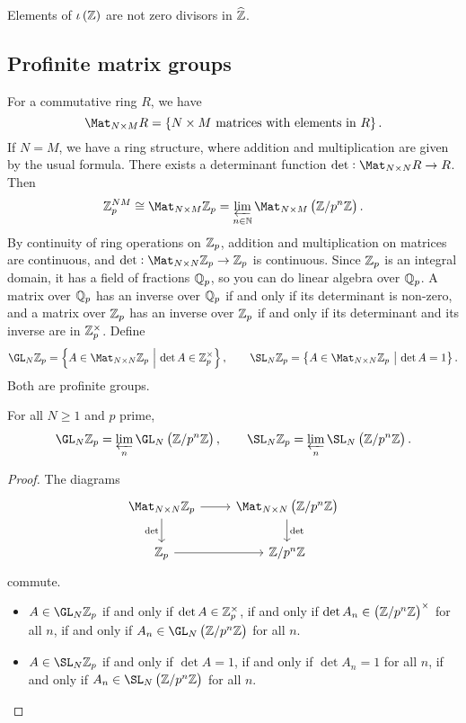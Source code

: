 Elements of $ \iota\br{\ZZ} $ are not zero divisors in $ \widehat{\mathbb{Z}} $.

\pagebreak

\subsection{Profinite matrix groups}


For a commutative ring $ R $, we have
$$ \Mat_{N \times M} R = \cbr{N \times M \ \text{matrices with elements in} \ R}. $$
If $ N = M $, we have a ring structure, where addition and multiplication are given by the usual formula. There exists a determinant function $ \det : \Mat_{N \times N} R \to R $. Then
$$ \ZZ_p^{NM} \cong \Mat_{N \times M} \ZZ_p = \varprojlim_{n \in \NN} \Mat_{N \times M} \br{\ZZ / p^n\ZZ}. $$
By continuity of ring operations on $ \mathbb{Z}_p $, addition and multiplication on matrices are continuous, and $ \det : \Mat_{N \times N} \ZZ_p \to \ZZ_p $ is continuous. Since $ \mathbb{Z}_p $ is an integral domain, it has a field of fractions $ \mathbb{Q}_p $, so you can do linear algebra over $ \mathbb{Q}_p $. A matrix over $ \mathbb{Q}_p $ has an inverse over $ \mathbb{Q}_p $ if and only if its determinant is non-zero, and a matrix over $ \mathbb{Z}_p $ has an inverse over $ \mathbb{Z}_p $ if and only if its determinant and its inverse are in $ \mathbb{Z}_p^\times $. Define
$$ \GL_N \ZZ_p = \cbr{A \in \Mat_{N \times N} \ZZ_p \st \det A \in \ZZ_p^\times}, \qquad \SL_N \ZZ_p = \cbr{A \in \Mat_{N \times N} \ZZ_p \st \det A = 1}. $$
Both are profinite groups.

\begin{lemma}
For all $ N \ge 1 $ and $ p $ prime,
$$ \GL_N \ZZ_p = \varprojlim_n \GL_N \br{\ZZ / p^n\ZZ}, \qquad \SL_N \ZZ_p = \varprojlim_n \SL_N \br{\ZZ / p^n\ZZ}. $$
\end{lemma}

\begin{proof}
The diagrams
$$
\begin{tikzcd}
\Mat_{N \times N} \ZZ_p \arrow{r} \arrow{d}[swap]{\det} & \Mat_{N \times N} \br{\ZZ / p^n\ZZ} \arrow{d}{\det} \\
\ZZ_p \arrow{r} & \ZZ / p^n\ZZ
\end{tikzcd}
$$
commute.
\begin{itemize}
\item $ A \in \GL_N \ZZ_p $ if and only if $ \det A \in \mathbb{Z}_p^\times $, if and only if $ \det A_n \in \br{\ZZ / p^n\ZZ}^\times $ for all $ n $, if and only if $ A_n \in \GL_N \br{\ZZ / p^n\ZZ} $ for all $ n $.
\item $ A \in \SL_N \ZZ_p $ if and only if $ \det A = 1 $, if and only if $ \det A_n = 1 $ for all $ n $, if and only if $ A_n \in \SL_N \br{\ZZ / p^n\ZZ} $ for all $ n $.
\end{itemize}
\end{proof}

